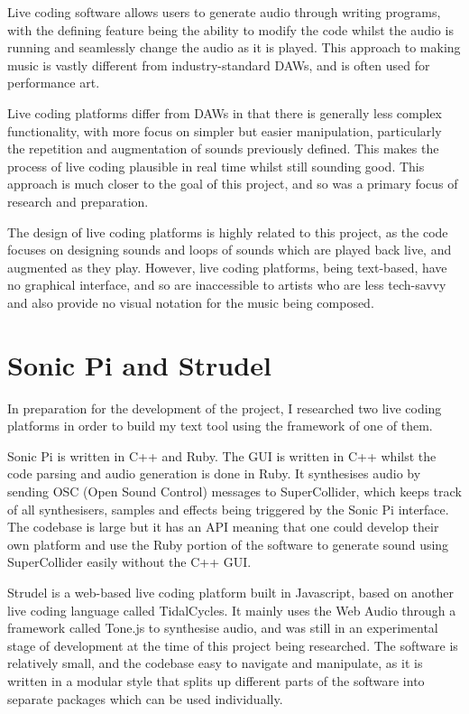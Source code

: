 \documentclass[12pt,a4paper,twoside,openright]{report}
\begin{document}
Live coding software allows users to generate audio through writing programs, with the defining feature being the ability to modify the code whilst the audio is running and seamlessly change the audio as it is played. This approach to making music is vastly different from industry-standard DAWs, and is often used for performance art.

Live coding platforms differ from DAWs in that there is generally less complex functionality, with more focus on simpler but easier manipulation, particularly the repetition and augmentation of sounds previously defined. This makes the process of live coding plausible in real time whilst still sounding good. This approach is much closer to the goal of this project, and so was a primary focus of research and preparation.

The design of live coding platforms is highly related to this project, as the code focuses on designing sounds and loops of sounds which are played back live, and augmented as they play. However, live coding platforms, being text-based, have no graphical interface, and so are inaccessible to artists who are less tech-savvy and also provide no visual notation for the music being composed.

\section{Sonic Pi and Strudel}
In preparation for the development of the project, I researched two live coding platforms in order to build my text tool using the framework of one of them.

Sonic Pi is written in C++ and Ruby. The GUI is written in C++ whilst the code parsing and audio generation is done in Ruby. It synthesises audio by sending OSC (Open Sound Control) messages to SuperCollider, which keeps track of all synthesisers, samples and effects being triggered by the Sonic Pi interface. The codebase is large but it has an API meaning that one could develop their own platform and use the Ruby portion of the software to generate sound using SuperCollider easily without the C++ GUI.

Strudel is a web-based live coding platform built in Javascript, based on another live coding language called TidalCycles. It mainly uses the Web Audio through a framework called Tone.js to synthesise audio, and was still in an experimental stage of development at the time of this project being researched. The software is relatively small, and the codebase easy to navigate and manipulate, as it is written in a modular style that splits up different parts of the software into separate packages which can be used individually.
\end{document}

